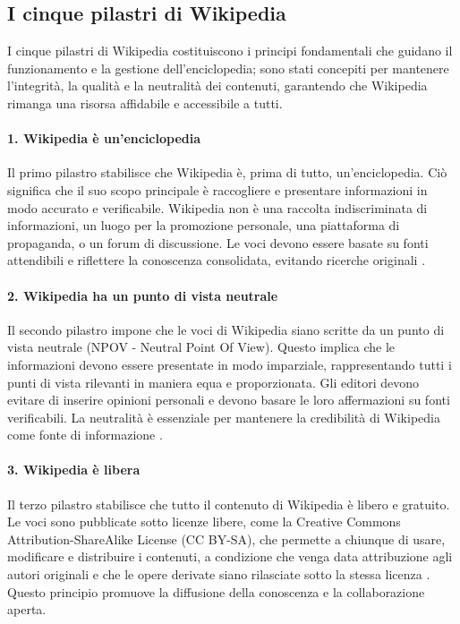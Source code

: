 \documentclass[12pt,a4paper]{report}
\begin{document}
\subsection{I cinque pilastri di Wikipedia}

I cinque pilastri di Wikipedia costituiscono i principi fondamentali che guidano il funzionamento e la gestione dell'enciclopedia; sono stati concepiti per mantenere l'integrità, la qualità e la neutralità dei contenuti, garantendo che Wikipedia rimanga una risorsa affidabile e accessibile a tutti.

\paragraph*{1. Wikipedia è un'enciclopedia}
Il primo pilastro stabilisce che Wikipedia è, prima di tutto, un'enciclopedia. Ciò significa che il suo scopo principale è raccogliere e presentare informazioni in modo accurato e verificabile. Wikipedia non è una raccolta indiscriminata di informazioni, un luogo per la promozione personale, una piattaforma di propaganda, o un forum di discussione. Le voci devono essere basate su fonti attendibili e riflettere la conoscenza consolidata, evitando ricerche originali \cite{reagle2010good}.

\paragraph*{2. Wikipedia ha un punto di vista neutrale}
Il secondo pilastro impone che le voci di Wikipedia siano scritte da un punto di vista neutrale (NPOV - Neutral Point Of View). Questo implica che le informazioni devono essere presentate in modo imparziale, rappresentando tutti i punti di vista rilevanti in maniera equa e proporzionata. Gli editori devono evitare di inserire opinioni personali e devono basare le loro affermazioni su fonti verificabili. La neutralità è essenziale per mantenere la credibilità di Wikipedia come fonte di informazione \cite{denning2005wikipedia}.

\paragraph*{3. Wikipedia è libera}
Il terzo pilastro stabilisce che tutto il contenuto di Wikipedia è libero e gratuito. Le voci sono pubblicate sotto licenze libere, come la Creative Commons Attribution-ShareAlike License (CC BY-SA), che permette a chiunque di usare, modificare e distribuire i contenuti, a condizione che venga data attribuzione agli autori originali e che le opere derivate siano rilasciate sotto la stessa licenza \cite{jemielniak2014wikipedia}. Questo principio promuove la diffusione della conoscenza e la collaborazione aperta.
\end{document}
